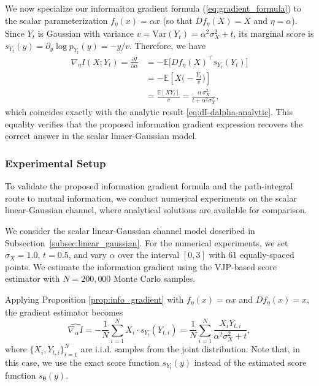 \documentclass[conference]{IEEEtran}
\begin{document}
We now specialize our informaiton gradient formula (\ref{eq:gradient_formula})
to the scalar parameterization $f_\eta(x)=\alpha x$ (so that $D f_\eta(X)=X$ and $\eta=\alpha$).
Since $Y_t$ is Gaussian with variance
$v=\mathrm{Var}(Y_t)=\alpha^2\sigma_X^2+t$, its marginal score is 
$s_{Y_t}(y)=\partial_y\log p_{Y_t}(y)=-y/v$. Therefore, we have
\begin{align*}
    \nabla_\eta I(X;Y_t) = \frac{\partial I}{\partial \alpha}
&= -\mathbb E\!\Big[D f_\eta(X)^\top s_{Y_t}(Y_t)\Big] \\
&=-\mathbb E\!\left[X\Big(-\frac{Y_t}{v}\Big)\right] \\
&=\frac{\mathbb E[XY_t]}{v} =\frac{\alpha\,\sigma_X^2}{t+\alpha^2\sigma_X^2},
\end{align*}
which coincides exactly with the analytic result \eqref{eq:dI-dalpha-analytic}. 
This equality verifies that the proposed information gradient expression 
recovers the correct answer in the scalar linaer-Gaussian model.

\subsubsection{Experimental Setup}

To validate the proposed information gradient formula 
and the path-integral route to mutual information, we conduct numerical experiments 
on the scalar linear-Gaussian channel, where analytical solutions are available for comparison.

We consider the scalar linear-Gaussian channel model
described in Subsection~\ref{subsec:linear_gaussian}.
For the numerical experiments,
we set $\sigma_X = 1.0$, $t = 0.5$, and vary $\alpha$
over the interval $[0, 3]$ with 61 equally-spaced points. 
We estimate the information
gradient using the VJP-based score estimator with 
$N = 200{,}000$ Monte Carlo samples.


Applying Proposition \ref{prop:info_gradient} with 
$f_\eta(x) = \alpha x$ 
and $Df_\eta(x) = x$, the gradient
estimator becomes
\begin{equation}
\widehat{\nabla_\alpha I} = -\frac{1}{N} \sum_{i=1}^N X_i 
\cdot s_{Y_t}(Y_{t,i}) =
\frac{1}{N} \sum_{i=1}^N \frac{X_i Y_{t,i}}{\alpha^2 \sigma_X^2 + t},
\end{equation}
where $\{X_i, Y_{t,i}\}_{i=1}^N$ are i.i.d. samples from the joint distribution. Note that, in this case, we use the exact score function $s_{Y_t}(y)$ instead of the estimated score function $s_{\bm \theta}(y)$.
\end{document}
